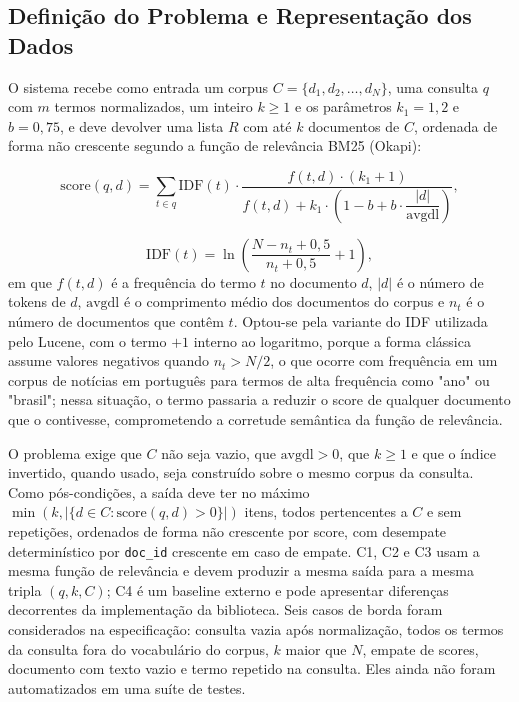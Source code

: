 \documentclass[12pt, a4paper]{article}
\begin{document}
\subsection{Definição do Problema e Representação dos Dados}

O sistema recebe como entrada um corpus $C = \{d_1, d_2, \dots, d_N\}$, uma consulta $q$ com $m$ termos normalizados, um inteiro $k \ge 1$ e os parâmetros $k_1 = 1{,}2$ e $b = 0{,}75$, e deve devolver uma lista $R$ com até $k$ documentos de $C$, ordenada de forma não crescente segundo a função de relevância BM25 (Okapi):

\[
\text{score}(q, d) = \sum_{t \in q} \text{IDF}(t) \cdot \frac{f(t,d) \cdot (k_1 + 1)}{f(t,d) + k_1 \cdot \left(1 - b + b \cdot \dfrac{|d|}{\text{avgdl}}\right)},
\]

\[
\text{IDF}(t) = \ln\left(\frac{N - n_t + 0{,}5}{n_t + 0{,}5} + 1\right),
\]
em que $f(t,d)$ é a frequência do termo $t$ no documento $d$, $|d|$ é o número de tokens de $d$, $\text{avgdl}$ é o comprimento médio dos documentos do corpus e $n_t$ é o número de documentos que contêm $t$. Optou-se pela variante do IDF utilizada pelo Lucene, com o termo $+1$ interno ao logaritmo, porque a forma clássica assume valores negativos quando $n_t > N/2$, o que ocorre com frequência em um corpus de notícias em português para termos de alta frequência como "ano" ou "brasil"; nessa situação, o termo passaria a reduzir o score de qualquer documento que o contivesse, comprometendo a corretude semântica da função de relevância.

O problema exige que $C$ não seja vazio, que $\text{avgdl} > 0$, que $k \ge 1$ e que o índice invertido, quando usado, seja construído sobre o mesmo corpus da consulta. Como pós-condições, a saída deve ter no máximo $\min(k, |\{d \in C : \text{score}(q,d) > 0\}|)$ itens, todos pertencentes a $C$ e sem repetições, ordenados de forma não crescente por score, com desempate determinístico por \texttt{doc\_id} crescente em caso de empate. C1, C2 e C3 usam a mesma função de relevância e devem produzir a mesma saída para a mesma tripla $(q, k, C)$; C4 é um baseline externo e pode apresentar diferenças decorrentes da implementação da biblioteca. Seis casos de borda foram considerados na especificação: consulta vazia após normalização, todos os termos da consulta fora do vocabulário do corpus, $k$ maior que $N$, empate de scores, documento com texto vazio e termo repetido na consulta. Eles ainda não foram automatizados em uma suíte de testes.
\end{document}
